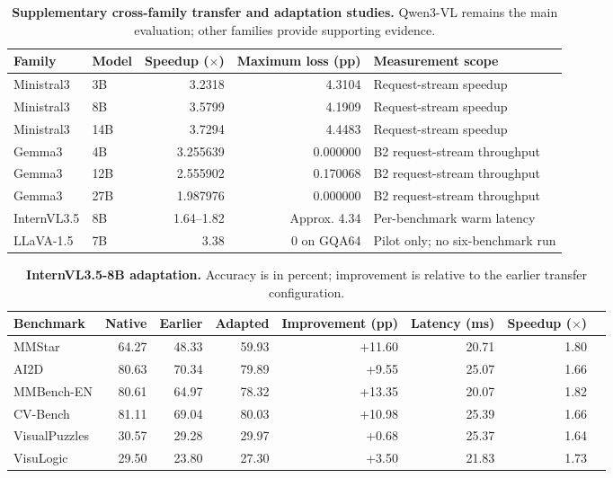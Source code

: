 \documentclass[10pt,a4paper,landscape]{article}
\newcommand{\tnote}[1]{\par\vspace{3pt}{\footnotesize #1}\par}
\begin{document}
\clearpage
\begin{table}[!ht]\centering
\caption{\textbf{Supplementary cross-family transfer and adaptation studies.} Qwen3-VL remains the main evaluation; other families provide supporting evidence.}
\small
\begin{tabular}{@{}llrrl@{}}\toprule
Family & Model & Speedup ($\times$) & Maximum loss (pp) & Measurement scope\\\midrule
Ministral3 & 3B & 3.2318 & 4.3104 & Request-stream speedup\\
Ministral3 & 8B & 3.5799 & 4.1909 & Request-stream speedup\\
Ministral3 & 14B & 3.7294 & 4.4483 & Request-stream speedup\\
\midrule
Gemma3 & 4B & 3.255639 & 0.000000 & B2 request-stream throughput\\
Gemma3 & 12B & 2.555902 & 0.170068 & B2 request-stream throughput\\
Gemma3 & 27B & 1.987976 & 0.000000 & B2 request-stream throughput\\
\midrule
InternVL3.5 & 8B & 1.64--1.82 & Approx. 4.34 & Per-benchmark warm latency\\
LLaVA-1.5 & 7B & 3.38 & 0 on GQA64 & Pilot only; no six-benchmark run\\
\bottomrule\end{tabular}
\tnote{These studies are not controlled single-component ablations or a unified speed ranking. Ministral includes request-time capture; Gemma compares B2 throughput against serial HF; InternVL reuses a historical fixed-image baseline; Qwen excludes initial capture. Ratios must not be averaged across families. The 42 full-benchmark comparisons exclude the LLaVA pilot.}
\end{table}
\begin{table}[!ht]\centering
\caption{\textbf{InternVL3.5-8B adaptation.} Accuracy is in percent; improvement is relative to the earlier transfer configuration.}
\small
\begin{tabular}{@{}lrrrrrrr@{}}\toprule
Benchmark & Native & Earlier & Adapted & Improvement (pp) & Latency (ms) & Speedup ($\times$)\\\midrule
MMStar & 64.27 & 48.33 & 59.93 & +11.60 & 20.71 & 1.80\\
AI2D & 80.63 & 70.34 & 79.89 & +9.55 & 25.07 & 1.66\\
MMBench-EN & 80.61 & 64.97 & 78.32 & +13.35 & 20.07 & 1.82\\
CV-Bench & 81.11 & 69.04 & 80.03 & +10.98 & 25.39 & 1.66\\
VisualPuzzles & 30.57 & 29.28 & 29.97 & +0.68 & 25.37 & 1.64\\
VisuLogic & 29.50 & 23.80 & 27.30 & +3.50 & 21.83 & 1.73\\
\bottomrule\end{tabular}
\tnote{The adapted model uses 448-pixel inputs, 26/36 language layers, all vision layers, calibrated static quantization, and a rank-32 recovery module. Calibration, resolution, and teacher/retraining change jointly; retained layer indices are unchanged. Latency is compared with historical H100 fixed-448 single-image controls, not a contemporaneous paired rerun or default dynamic tiling.}
\end{table}
\end{document}
